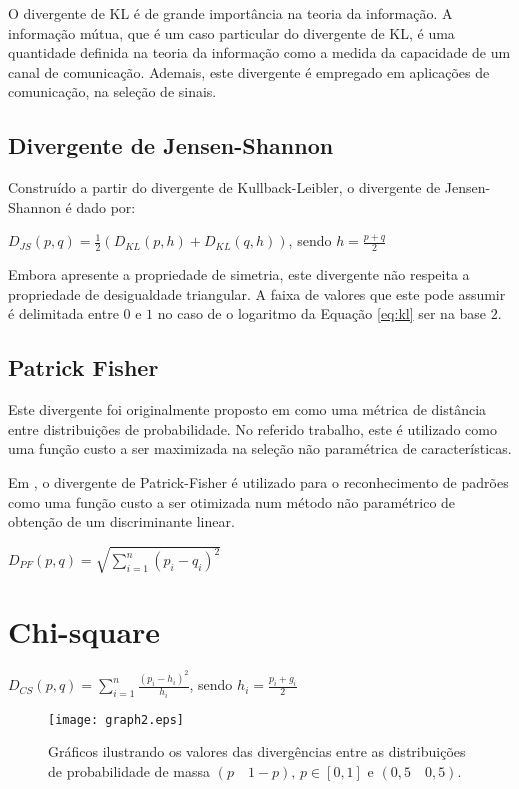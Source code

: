 O divergente de KL é de grande importância na teoria da informação. A informação mútua, que é um caso particular do divergente de KL, é uma quantidade definida na teoria da informação como a  medida da capacidade de um canal de comunicação. Ademais, este divergente é empregado em aplicações de comunicação, na seleção de sinais.  

\subsection{Divergente de Jensen-Shannon}

Construído a partir do divergente de Kullback-Leibler, o divergente de Jensen-Shannon é dado por: 

$D_{JS}(p,q) =\frac{1}{2}(D_{KL}(p,h)+D_{KL}(q,h))$, sendo $h = \frac{p+q}{2}$

Embora apresente a propriedade de simetria, este divergente não respeita a propriedade de desigualdade triangular. A faixa de valores que este pode assumir é delimitada entre $0$ e $1$ no caso de o logaritmo da Equação \ref{eq:kl} ser na base $2$. 

\subsection{Patrick Fisher}

Este divergente foi originalmente proposto em  como uma métrica de distância entre distribuições de probabilidade. No referido trabalho, este é utilizado como uma função custo a ser maximizada na seleção não paramétrica de características.

Em \cite{662771}, o divergente de Patrick-Fisher é utilizado para o reconhecimento de padrões como uma função custo a ser otimizada num método não paramétrico de obtenção de um discriminante linear.  

$D_{PF}(p,q) = \sqrt{\sum\limits_{i=1}^{n}{(p_i-q_i)}^2}$

\section{Chi-square}
$D_{CS}(p,q)= \sum\limits_{i = 1}^{n}{\frac{(p_{i}-h_{i})^2}{h_{i}}}$, sendo $h_{i} = \frac{p_{i} + g_{i}}{2}$

\begin{figure}[h!]
  \caption{\label{fig:graph2} Gráficos ilustrando os valores das divergências entre as distribuições de probabilidade de massa $(p\quad1-p)\text{, } p \in [0,1]$ e $(0,5\quad0,5)$.}
  \centering
  \texttt{[image: graph2.eps]}
\end{figure}

